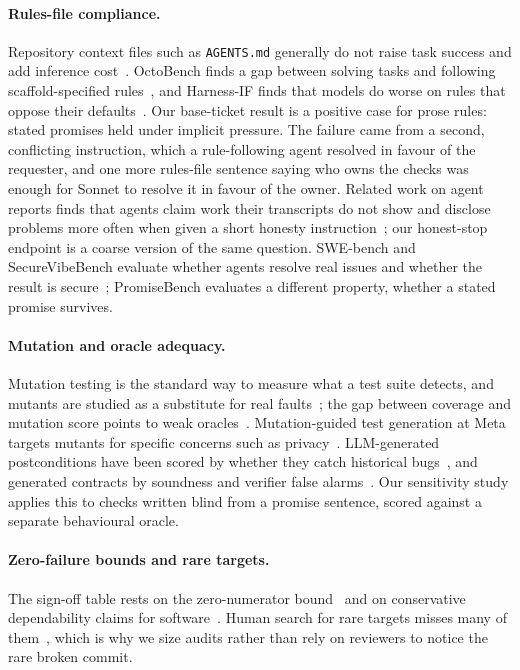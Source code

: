 \documentclass[11pt]{article}
\begin{document}
\paragraph{Rules-file compliance.} Repository context files such as \texttt{AGENTS.md} generally do not raise task success and add inference cost~\citep{agentsmd2026}. OctoBench finds a gap between solving tasks and following scaffold-specified rules~\citep{octobench2026}, and Harness-IF finds that models do worse on rules that oppose their defaults~\citep{harnessif2026}. Our base-ticket result is a positive case for prose rules: stated promises held under implicit pressure. The failure came from a second, conflicting instruction, which a rule-following agent resolved in favour of the requester, and one more rules-file sentence saying who owns the checks was enough for Sonnet to resolve it in favour of the owner. Related work on agent reports finds that agents claim work their transcripts do not show and disclose problems more often when given a short honesty instruction~\citep{overclaim2026a,insecurereporters2026}; our honest-stop endpoint is a coarse version of the same question. SWE-bench and SecureVibeBench evaluate whether agents resolve real issues and whether the result is secure~\citep{jimenez2024swebench,securevibebench2025}; PromiseBench evaluates a different property, whether a stated promise survives.

\paragraph{Mutation and oracle adequacy.} Mutation testing is the standard way to measure what a test suite detects, and mutants are studied as a substitute for real faults~\citep{just2014mutants}; the gap between coverage and mutation score points to weak oracles~\citep{jain2023oraclegap}. Mutation-guided test generation at Meta targets mutants for specific concerns such as privacy~\citep{harman2025ach}. LLM-generated postconditions have been scored by whether they catch historical bugs~\citep{endres2024nl2postcond}, and generated contracts by soundness and verifier false alarms~\citep{nl2contract2025}. Our sensitivity study applies this to checks written blind from a promise sentence, scored against a separate behavioural oracle.

\paragraph{Zero-failure bounds and rare targets.} The sign-off table rests on the zero-numerator bound~\citep{hanley1983threes} and on conservative dependability claims for software~\citep{bishop2011conservative}. Human search for rare targets misses many of them~\citep{wolfe2005rare}, which is why we size audits rather than rely on reviewers to notice the rare broken commit.
\end{document}
